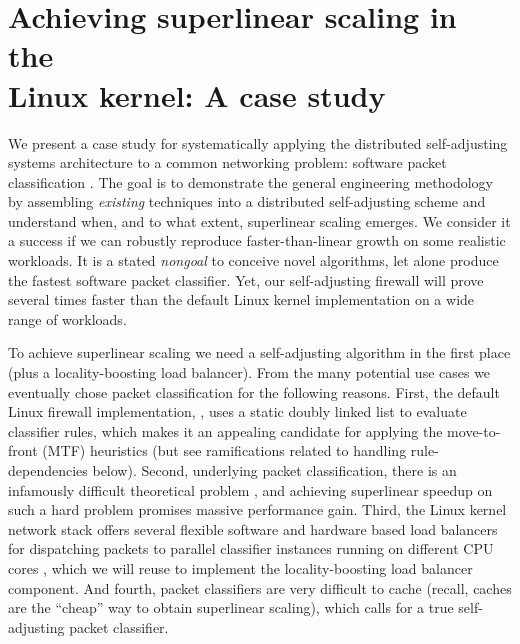 \section{Achieving superlinear scaling in the \\Linux kernel: A case study}\label{sec:case-study}

We present a case study for systematically applying the distributed self-adjusting systems architecture to a common networking problem: software packet classification \cite{gupta2001algorithms}. The goal is to demonstrate the general engineering methodology by assembling \emph{existing} techniques into a distributed self-adjusting scheme and understand when, and to what extent, superlinear scaling emerges. We consider it a success if we can robustly reproduce faster-than-linear growth on some realistic workloads. It is a stated \emph{nongoal} to conceive novel algorithms, let alone produce the fastest software packet classifier. %
Yet, our self-adjusting firewall will prove several times faster than the default Linux kernel implementation on a wide range of workloads.

To achieve superlinear scaling we need a self-adjusting algorithm in the first place (plus a locality-boosting load balancer). From the many potential use cases %
\cite{SleatorT85Splay, BentleyCL93, HesterH85, HesterH85, BentleySTW86, Avin0020, ParkM12} we eventually chose packet classification for the following reasons.  First, the default Linux firewall implementation, \nftables, uses a static doubly linked list to evaluate classifier rules, which makes it an appealing candidate for applying the move-to-front (MTF) heuristics (but see ramifications related to handling rule-dependencies below). %
Second, underlying packet classification, there is an infamously difficult theoretical problem \cite{10.1145/2619239.2626294,10.1006/jagm.1996.0063, PacutVAPRS2022, 10.1145/2619239.2626294, 10.1145/1851182.1851208, 10.1145/863955.863980, gupta2001algorithms}, %
and achieving superlinear speedup on such a hard problem promises massive performance gain. Third, the Linux kernel network stack offers several flexible software and hardware based load balancers for dispatching packets to parallel classifier instances running on different CPU cores \cite{rss-linux}, which we will reuse to implement the locality-boosting load balancer component. And fourth, packet classifiers are very difficult to cache \cite{1354643} (recall, caches are the ``cheap'' way to obtain superlinear scaling), which calls for a true self-adjusting packet classifier. %

